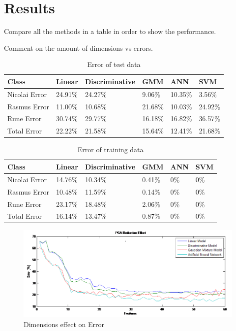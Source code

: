\section{Results}

Compare all the methods in a table in order to show the performance.

Comment on the amount of dimensions vs errors.


\begin{table}[H]
\centering
\begin{tabular}{llllll}
\hline
Class		&	Linear	&  Discriminative  & GMM  & ANN	& SVM \\ \hline
Nicolai Error &	24.91\%  & 24.27\%  &  9.06\%  & 10.35\%  &  3.56\% \\
Rasmus Error  &	11.00\%  & 10.68\%  & 21.68\%  & 10.03\%  & 24.92\% \\
Rune Error	  &	30.74\%  & 29.77\%  & 16.18\%  & 16.82\%  & 36.57\% \\ \hline
Total Error	  &	22.22\%  & 21.58\%  & 15.64\%  & 12.41\%  & 21.68\% \\ \hline
\end{tabular}
\caption{ Error of test data }
\end{table}



\begin{table}[H]
\centering
\begin{tabular}{llllll}
\hline
Class		&	Linear	&  Discriminative  & GMM  & ANN	& SVM \\ \hline
Nicolai Error &	14.76\%  & 10.34\%  &  0.41\%  & 0\%  &  0\% \\
Rasmus Error  &	10.48\%  & 11.59\%  & 0.14\%  & 0\%  & 0\% \\
Rune Error	  &	23.17\%  & 18.48\%  & 2.06\%  & 0\%  & 0\% \\ \hline
Total Error	  &	16.14\%  & 13.47\%  & 0.87\%  & 0\%  & 0\% \\ \hline
\end{tabular}
\caption{ Error of training data }
\end{table}


\begin{figure}[H]
\centering
\includegraphics[scale=0.7]{billeder/PCAReductionEffect}
\caption{ Dimensions effect on Error }
\label{fig:DimError}
\end{figure}

